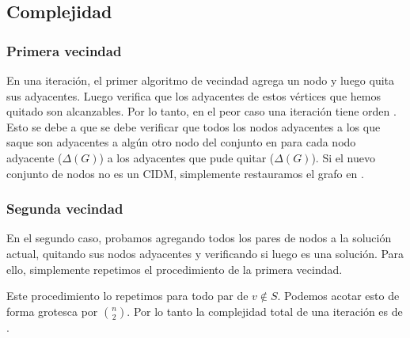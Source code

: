 \subsection{Complejidad}

\subsubsection{Primera vecindad}

En una iteración, el primer algoritmo de vecindad agrega un nodo y luego quita sus adyacentes. Luego verifica que los adyacentes de estos vértices que hemos quitado son alcanzables. Por lo tanto, en el peor caso una iteración tiene orden . Esto se debe a que se debe verificar que todos los nodos adyacentes a los que saque son adyacentes a algún otro nodo del conjunto en  para cada nodo adyacente ($\Delta(G)$) a los adyacentes que pude quitar ($\Delta(G)$). Si el nuevo conjunto de nodos no es un CIDM, simplemente restauramos el grafo en .

\subsubsection{Segunda vecindad}

En el segundo caso, probamos agregando todos los pares de nodos a la solución actual, quitando sus nodos adyacentes y verificando si luego es una solución. Para ello, simplemente repetimos el procedimiento de la primera vecindad.

Este procedimiento lo repetimos para todo par de $v \not\in S$. Podemos acotar esto de forma grotesca por $\binom{n}{2}$. Por lo tanto la complejidad total de una iteración es de .
